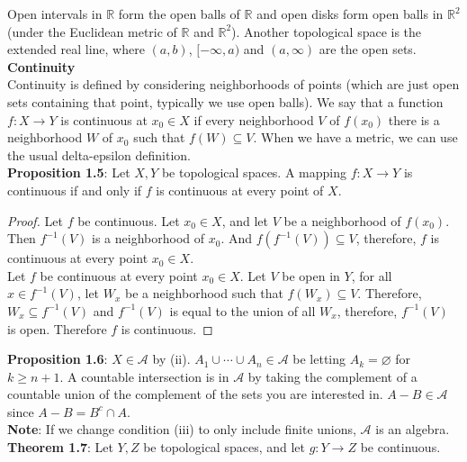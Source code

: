 \documentclass[12pt]{article}
\let\emptyset\varnothing
\begin{document}
\noindent Open intervals in $\mathbb{R}$ form the open balls of $\mathbb{R}$ and open disks form open balls in $\mathbb{R}^2$ (under the Euclidean metric of $\mathbb{R}$ and $\mathbb{R}^2$).  Another topological space is the extended real line, where $(a,b)$, $[-\infty,a)$ and $(a, \infty)$ are the open sets. \\

\noindent \textbf{Continuity} \\
\noindent Continuity is defined by considering neighborhoods of points (which are just open sets containing that point, typically we use open balls). We say that a  function $f: X \rightarrow Y$ is continuous at $x_0 \in X$ if every neighborhood $V$ of $f(x_0)$ there is a neighborhood $W$ of $x_0$ such that $f(W) \subseteq V$.  When we have a metric, we can use the usual delta-epsilon definition. \\

\noindent \textbf{Proposition 1.5}: Let $X,Y$ be topological spaces. A mapping $f: X\rightarrow Y$ is continuous if and only if $f$ is continuous at every point of $X$. 
\begin{proof}
Let $f$ be continuous. Let $x_0 \in X$, and let $V$ be a neighborhood of $f(x_0)$. Then $f^{-1}(V)$ is a neighborhood of $x_0$. And $f(f^{-1}(V)) \subseteq V$, therefore, $f$ is continuous at every point $x_0 \in X$. \\

\noindent Let $f$ be continuous at every point $x_0 \in X$. Let $V$ be open in $Y$, for all $x \in f^{-1}(V)$, let $W_x$ be a neighborhood such that $f(W_x) \subseteq V$. Therefore, $W_x \subseteq f^{-1}(V)$ and $f^{-1}(V)$ is equal to the union of all $W_x$, therefore, $f^{-1}(V)$ is open. Therefore $f$ is continuous. 
\end{proof}

\noindent \textbf{Proposition 1.6}: $X \in \mathcal{A}$ by (ii). $A_1 \cup \cdots \cup A_n \in \mathcal{A}$ be letting $A_k = \emptyset$ for $k \geq n+1$. A countable intersection is in $\mathcal{A}$ by taking the complement of a countable union of the complement of the sets you are interested in. $A-B \in \mathcal{A}$ since $A-B = B^c \cap A$. \\

\noindent \textbf{Note}: If we change condition (iii) to only include finite unions, $\mathcal{A}$ is an algebra. \\

\noindent \textbf{Theorem 1.7}: Let $Y,Z$ be topological spaces, and let $g: Y \rightarrow Z$ be continuous.  \\
\end{document}
